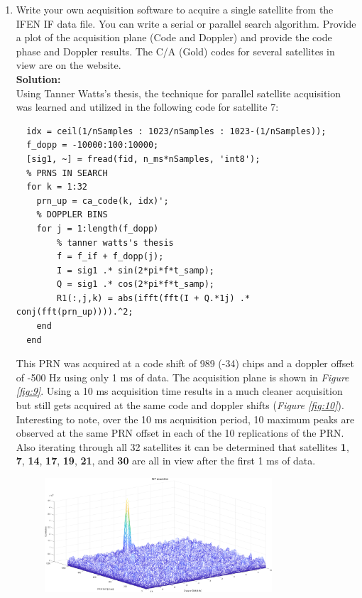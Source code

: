 \documentclass[10pt]{article}
\newcommand{\solution}{\textbf{Solution: \\}}
\begin{document}
\begin{enumerate}[label=\textbf{\arabic*.}]
  \item Write your own acquisition software to acquire a single satellite from 
  the IFEN IF data file. You can write a serial or parallel search algorithm. 
  Provide a plot of the acquisition plane (Code and Doppler) and provide the 
  code phase and Doppler results. The C/A (Gold) codes for several satellites 
  in view are on the website. \\
  \solution
  Using Tanner Watts's thesis, the technique for parallel satellite acquisition 
  was learned and utilized in the following code for satellite 7:
  \begin{lstlisting}
  idx = ceil(1/nSamples : 1023/nSamples : 1023-(1/nSamples));
  f_dopp = -10000:100:10000;
  [sig1, ~] = fread(fid, n_ms*nSamples, 'int8');
  % PRNS IN SEARCH
  for k = 1:32  
    prn_up = ca_code(k, idx)';
    % DOPPLER BINS
    for j = 1:length(f_dopp)
        % tanner watts's thesis
        f = f_if + f_dopp(j);
        I = sig1 .* sin(2*pi*f*t_samp);
        Q = sig1 .* cos(2*pi*f*t_samp);
        R1(:,j,k) = abs(ifft(fft(I + Q.*1j) .* conj(fft(prn_up)))).^2;
    end
  end
  \end{lstlisting}
  This PRN was acquired at a code shift of 989 (-34) chips and a doppler offset 
  of -500 Hz using only 1 ms of data. The acquisition plane is shown in 
  \emph{Figure \ref{fig:9}}. Using a 10 ms acquisition time results in a much 
  cleaner acquisition but still gets acquired at the same code and doppler 
  shifts (\emph{Figure \ref{fig:10}}). Interesting to note, over the 10 ms 
  acquisition period, 10 maximum peaks are observed at the same PRN offset in 
  each of the 10 replications of the PRN. Also iterating through all 32 
  satellites it can be determined that satellites {\bf{1}}, {\bf{7}}, {\bf{14}}, 
  {\bf{17}}, {\bf{19}}, {\bf{21}}, and {\bf{30}} are all in view after the first 
  1 ms of data.
  \newpage
  \begin{figure}[h]
    \centering
    \includegraphics[width=0.8\textwidth]{p7_SV7.png}

\end{figure}
\end{enumerate}
\end{document}
